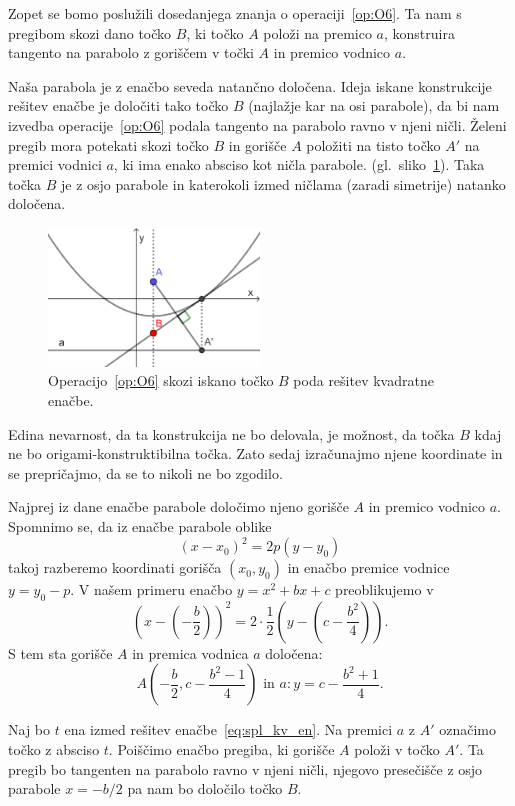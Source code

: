 Zopet se bomo poslužili dosedanjega znanja o operaciji~\ref{op:O6}. Ta nam s pregibom skozi dano točko $B$, ki točko $A$ položi na premico $a$, konstruira tangento na parabolo z goriščem v točki $A$ in premico vodnico $a$.

Naša parabola je z enačbo seveda natančno določena. Ideja iskane konstrukcije rešitev enačbe je določiti tako točko $B$ (najlažje kar na osi parabole), da bi nam izvedba operacije~\ref{op:O6} podala tangento na parabolo ravno v njeni ničli. Želeni pregib mora potekati skozi točko $B$ in gorišče $A$ položiti na tisto točko $A'$ na premici vodnici $a$, ki ima enako absciso kot ničla parabole. (gl.\ sliko~\ref{fig:tockaB_in_O6}). Taka točka $B$ je z osjo parabole in katerokoli izmed ničlama (zaradi simetrije) natanko določena.

\begin{figure}[h]
    \centering
    \includegraphics[width=0.5\textwidth]{images/kvadratna_enacba/tockaB_in_O6.png}
    \caption[Iskanje točke $B$]{Operacijo~\ref{op:O6} skozi iskano točko $B$ poda rešitev kvadratne enačbe.}
    \label{fig:tockaB_in_O6}
\end{figure}

Edina nevarnost, da ta konstrukcija ne bo delovala, je možnost, da točka $B$ kdaj ne bo origami-konstruktibilna točka. Zato sedaj izračunajmo njene koordinate in se prepričajmo, da se to nikoli ne bo zgodilo.

Najprej iz dane enačbe parabole določimo njeno gorišče $A$ in premico vodnico $a$. Spomnimo se, da iz enačbe parabole oblike
$$ (x - x_0)^2 = 2p(y - y_0) $$
takoj razberemo koordinati gorišča $(x_0, y_0)$ in enačbo premice vodnice $y = y_0 - p$. V našem primeru enačbo $y = x^2 + bx + c$ preoblikujemo v
$$ \left(x-\left(-\frac{b}{2}\right)\right)^2 = 2 \cdot \frac{1}{2} \left(y - \left(c - \frac{b^2}{4}\right)\right). $$
S tem sta gorišče $A$ in premica vodnica $a$ določena:
$$ A\left(-\frac{b}{2}, c - \frac{b^2 - 1}{4}\right) \text{ in } a: y = c - \frac{b^2 + 1}{4}. $$

Naj bo $t$ ena izmed rešitev enačbe~\ref{eq:spl_kv_en}. Na premici $a$ z $A'$ označimo točko z absciso $t$. Poiščimo enačbo pregiba, ki gorišče $A$ položi v točko $A'$. Ta pregib bo tangenten na parabolo ravno v njeni ničli, njegovo presečišče z osjo parabole $ x = -b/2 $ pa nam bo določilo točko $B$.


